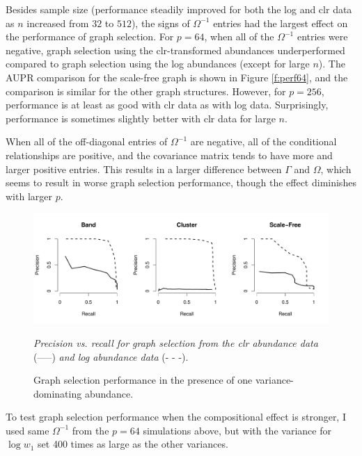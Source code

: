 \documentclass[10pt]{article}
\begin{document}
Besides sample size (performance steadily improved for both the log and clr data as $n$ increased from $32$ to $512$), the signs of $\Omega^{-1}$ entries had the largest effect on the performance of graph selection. For $p = 64$, when all of the $\Omega^{-1}$ entries were negative, graph selection using the clr-transformed abundances underperformed compared to graph selection using the log abundances (except for large $n$). The AUPR comparison for the scale-free graph is shown in Figure \ref{f:perf64}, and the comparison is similar for the other graph structures. However, for $p = 256$, performance is at least as good with clr data as with log data. Surprisingly, performance is sometimes slightly better with clr data for large $n$.

When all of the off-diagonal entries of $\Omega^{-1}$ are negative, all of the conditional relationships are positive, and the covariance matrix tends to have more and larger positive entries. This results in a larger difference between $\Gamma$ and $\Omega$, which seems to result in worse graph selection performance, though the effect diminishes with larger $p$.

\begin{figure}
\caption{Graph selection performance in the presence of one variance-dominating abundance.}
\label{f:prcurves}
\begin{center}
\includegraphics[width=6.5in]{figs/var-dom-pr.pdf}
\begin{small}
\textit{Precision vs. recall for graph selection from the clr abundance data} (-----) \textit{and log abundance data} (- - -).
\end{small}
\end{center}
\end{figure}

To test graph selection performance when the compositional effect is stronger, I used same $\Omega^{-1}$ from the $p = 64$ simulations above, but with the variance for $\log w_1$ set 400 times as large as the other variances.
\end{document}
